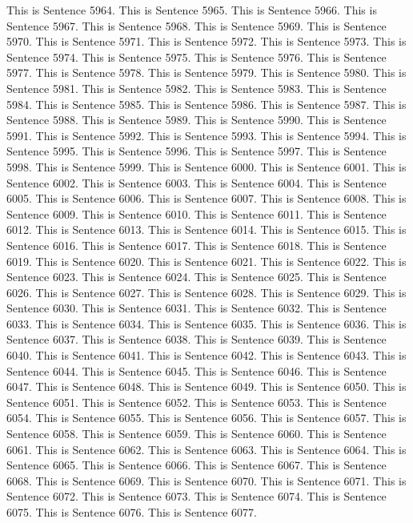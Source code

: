\documentclass{article}
\begin{document}
This is Sentence 5964.
This is Sentence 5965.
This is Sentence 5966.
This is Sentence 5967.
This is Sentence 5968.
This is Sentence 5969.
This is Sentence 5970.
This is Sentence 5971.
This is Sentence 5972.
This is Sentence 5973.
This is Sentence 5974.
This is Sentence 5975.
This is Sentence 5976.
This is Sentence 5977.
This is Sentence 5978.
This is Sentence 5979.
This is Sentence 5980.
This is Sentence 5981.
This is Sentence 5982.
This is Sentence 5983.
This is Sentence 5984.
This is Sentence 5985.
This is Sentence 5986.
This is Sentence 5987.
This is Sentence 5988.
This is Sentence 5989.
This is Sentence 5990.
This is Sentence 5991.
This is Sentence 5992.
This is Sentence 5993.
This is Sentence 5994.
This is Sentence 5995.
This is Sentence 5996.
This is Sentence 5997.
This is Sentence 5998.
This is Sentence 5999.
This is Sentence 6000.
This is Sentence 6001.
This is Sentence 6002.
This is Sentence 6003.
This is Sentence 6004.
This is Sentence 6005.
This is Sentence 6006.
This is Sentence 6007.
This is Sentence 6008.
This is Sentence 6009.
This is Sentence 6010.
This is Sentence 6011.
This is Sentence 6012.
This is Sentence 6013.
This is Sentence 6014.
This is Sentence 6015.
This is Sentence 6016.
This is Sentence 6017.
This is Sentence 6018.
This is Sentence 6019.
This is Sentence 6020.
This is Sentence 6021.
This is Sentence 6022.
This is Sentence 6023.
This is Sentence 6024.
This is Sentence 6025.
This is Sentence 6026.
This is Sentence 6027.
This is Sentence 6028.
This is Sentence 6029.
This is Sentence 6030.
This is Sentence 6031.
This is Sentence 6032.
This is Sentence 6033.
This is Sentence 6034.
This is Sentence 6035.
This is Sentence 6036.
This is Sentence 6037.
This is Sentence 6038.
This is Sentence 6039.
This is Sentence 6040.
This is Sentence 6041.
This is Sentence 6042.
This is Sentence 6043.
This is Sentence 6044.
This is Sentence 6045.
This is Sentence 6046.
This is Sentence 6047.
This is Sentence 6048.
This is Sentence 6049.
This is Sentence 6050.
This is Sentence 6051.
This is Sentence 6052.
This is Sentence 6053.
This is Sentence 6054.
This is Sentence 6055.
This is Sentence 6056.
This is Sentence 6057.
This is Sentence 6058.
This is Sentence 6059.
This is Sentence 6060.
This is Sentence 6061.
This is Sentence 6062.
This is Sentence 6063.
This is Sentence 6064.
This is Sentence 6065.
This is Sentence 6066.
This is Sentence 6067.
This is Sentence 6068.
This is Sentence 6069.
This is Sentence 6070.
This is Sentence 6071.
This is Sentence 6072.
This is Sentence 6073.
This is Sentence 6074.
This is Sentence 6075.
This is Sentence 6076.
This is Sentence 6077.
\end{document}

